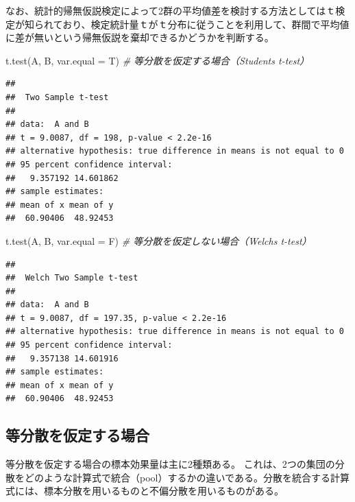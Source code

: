 \documentclass[
  ja=standard, xelatex, base=12pt]{bxjsreport}
\newenvironment{Shaded}{\begin{snugshade}}{\end{snugshade}}
\newcommand{\AttributeTok}[1]{\textcolor[rgb]{0.77,0.63,0.00}{#1}}
\newcommand{\CommentTok}[1]{\textcolor[rgb]{0.56,0.35,0.01}{\textit{#1}}}
\newcommand{\FunctionTok}[1]{\textcolor[rgb]{0.00,0.00,0.00}{#1}}
\newcommand{\NormalTok}[1]{#1}
\begin{document}
なお、統計的帰無仮説検定によって2群の平均値差を検討する方法としてはｔ検定が知られており、検定統計量ｔがｔ分布に従うことを利用して、群間で平均値に差が無いという帰無仮説を棄却できるかどうかを判断する。

\begin{Shaded}
\begin{Highlighting}[]
\FunctionTok{t.test}\NormalTok{(A, B, }\AttributeTok{var.equal =}\NormalTok{ T) }\CommentTok{\# 等分散を仮定する場合（Student\textquotesingle{}s t{-}test）}
\end{Highlighting}
\end{Shaded}

\begin{verbatim}
## 
##  Two Sample t-test
## 
## data:  A and B
## t = 9.0087, df = 198, p-value < 2.2e-16
## alternative hypothesis: true difference in means is not equal to 0
## 95 percent confidence interval:
##   9.357192 14.601862
## sample estimates:
## mean of x mean of y 
##  60.90406  48.92453
\end{verbatim}

\begin{Shaded}
\begin{Highlighting}[]
\FunctionTok{t.test}\NormalTok{(A, B, }\AttributeTok{var.equal =}\NormalTok{ F) }\CommentTok{\# 等分散を仮定しない場合（Welch\textquotesingle{}s t{-}test）}
\end{Highlighting}
\end{Shaded}

\begin{verbatim}
## 
##  Welch Two Sample t-test
## 
## data:  A and B
## t = 9.0087, df = 197.35, p-value < 2.2e-16
## alternative hypothesis: true difference in means is not equal to 0
## 95 percent confidence interval:
##   9.357138 14.601916
## sample estimates:
## mean of x mean of y 
##  60.90406  48.92453
\end{verbatim}

\hypertarget{ux7b49ux5206ux6563ux3092ux4eeeux5b9aux3059ux308bux5834ux5408}{%
\subsection{等分散を仮定する場合}\label{ux7b49ux5206ux6563ux3092ux4eeeux5b9aux3059ux308bux5834ux5408}}

等分散を仮定する場合の標本効果量は主に2種類ある。 これは、2つの集団の分散をどのような計算式で統合（pool）するかの違いである。分散を統合する計算式には、標本分散を用いるものと不偏分散を用いるものがある。
\end{document}
